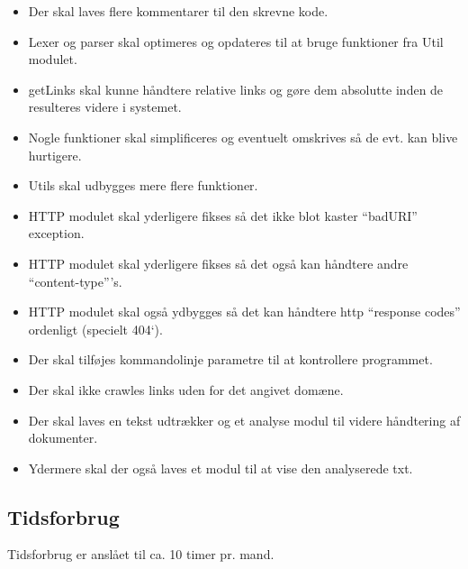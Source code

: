 \documentclass[a4paper,10pt,draft]{article}
\begin{document}
\begin{itemize}
 \item Der skal laves flere kommentarer til den skrevne kode.
\item Lexer og parser skal optimeres og opdateres til at bruge funktioner fra Util modulet.
\item getLinks skal kunne håndtere relative links og gøre dem absolutte inden de resulteres videre i systemet.
\item Nogle funktioner skal simplificeres og eventuelt omskrives så de evt. kan blive hurtigere.
\item Utils skal udbygges mere flere funktioner.
\item HTTP modulet skal yderligere fikses så det ikke blot kaster ``badURI'' exception.
\item HTTP modulet skal yderligere fikses så det også kan håndtere andre ``content-type'''s.
\item HTTP modulet skal også ydbygges så det kan håndtere http ``response codes'' ordenligt (specielt 404`).
\item Der skal tilføjes kommandolinje parametre til at kontrollere programmet.
\item Der skal ikke crawles links uden for det angivet domæne.
\item Der skal laves en tekst udtrækker og et analyse modul til videre håndtering af dokumenter.
\item Ydermere skal der også laves et modul til at vise den analyserede txt.
\end{itemize}


\subsection{Tidsforbrug}
Tidsforbrug er anslået til ca. 10 timer pr. mand.
\end{document}
